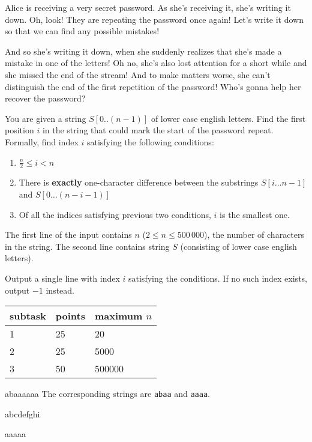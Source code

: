 





Alice is receiving a very secret password. As she's receiving it, she's writing
it down. Oh, look! They are repeating the password once again! Let's write it down
so that we can find any possible mistakes!

And so she's writing it down, when she suddenly realizes that she's made a mistake
in one of the letters! Oh no, she's also lost attention for a short while and she
missed the end of the stream! And to make matters worse, she can't distinguish the
end of the first repetition of the password! Who's gonna help her recover the password?


You are given a string $S[0..(n-1)]$ of lower case english letters. Find the first position $i$ in the
string that could mark the start of the password repeat. Formally, find index $i$ satisfying the following conditions:

\begin{enumerate}
    \item $\frac{n}{2} \leq i < n$
    \item There is \textbf{exactly} one-character difference between the
    substrings $S[i\ldots n-1]$ and $S[0\ldots (n - i - 1)]$
    \item Of all the indices satisfying previous two conditions, $i$ is the
    smallest one.
\end{enumerate}


The first line of the input contains $n$ ($2 \leq n \leq 500\,000$), the number of characters in the string.
The second line contains string $S$ (consisting of lower case english letters).


Output a single line with index $i$ satisfying the conditions. If no such index
exists, output $-1$ instead.


\centering
\begin{tabular}{|l|l|l|}
\hline
subtask & points & maximum $n$  \\ \hline
1       & 25     & 20           \\ \hline
2       & 25     & 5000         \\ \hline
3       & 50     & 500000       \\ \hline
\end{tabular}




abaaaaaa
\sampleCOMMENT
The corresponding strings are \texttt{abaa} and \texttt{aaaa}.
\sampleEND


\bigskip


abcdefghi
\sampleEND

\bigskip

aaaaa
\sampleEND


